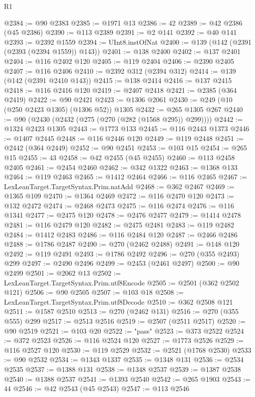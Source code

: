 \begin{lexlean}{R1}
\begin{coremodule}
@2384 := @90 @2383
@2385 := @1971 @13
@2386 := 42
@2389 := @42 @2386 (@45 @2386)
@2390 := @113 @2389
@2391 := @2 @141
@2392 := @40 @141
@2393 := @2392 @1559
@2394 := UInt8.instOfNat
@2400 := @139 (@142 (@2391 (@2393 (@2394 @1559)) @143))
@2401 := @138 @2400
@2402 := @137 @2401
@2404 := @116 @2402 @120
@2405 := @119 @2404
@2406 := @2390 @2405
@2407 := @116 @2406
@2410 := @2392 @312 (@2394 @312)
@2414 := @139 (@142 (@2391 @2410 @143))
@2415 := @138 @2414
@2416 := @137 @2415
@2418 := @116 @2416 @120
@2419 := @2407 @2418
@2421 := @2385 (@364 @2419)
@2422 := @90 @2421
@2423 := @1306 @2061
@2430 := @249 (@10 (@250 @2423 @1305) (@1306 @52)) @1305
@2432 := @265 @1305 @267
@2440 := @90 (@2430 (@2432 (@275 (@270 (@282 (@1568 @295)) @299))))
@2442 := @1324 @2423 @1305
@2443 := @1773 @133
@2445 := @116 @2443 @1373
@2446 := @1407 @2445
@2448 := @116 @2446 @120
@2449 := @119 @2448
@2451 := @2442 (@364 @2449)
@2452 := @90 @2451
@2453 := @103 @15
@2454 := @265 @15
@2455 := 43
@2458 := @42 @2455 (@45 @2455)
@2460 := @113 @2458 @2405
@2461 := @2454 @2460
@2462 := @342 @1322
@2463 := @1368 @133
@2464 := @119 @2463
@2465 := @1412 @2464
@2466 := @116 @2465
@2467 := LexLeanTarget.TargetSyntax.Prim.natAdd
@2468 := @362 @2467
@2469 := @1365 @109
@2470 := @1364 @2469
@2472 := @116 @2470 @120
@2473 := @132 @2472
@2474 := @2468 @2473
@2475 := @116 @2474
@2476 := @116 @1341
@2477 := @2475 @120
@2478 := @2476 @2477
@2479 := @1414 @2478
@2481 := @116 @2479 @120
@2482 := @2475 @2481
@2483 := @119 @2482
@2484 := @1412 @2483
@2486 := @116 @2484 @120
@2487 := @2466 @2486
@2488 := @1786 @2487
@2490 := @270 (@2462 @2488)
@2491 := @148 @120
@2492 := @119 @2491
@2493 := @1786 @2492
@2496 := @270 (@355 @2493) @299
@2497 := @2490 @2496
@2499 := @2453 (@2461 @2497)
@2500 := @90 @2499
@2501 := @2062 @13
@2502 := LexLeanTarget.TargetSyntax.Prim.utf8Encode
@2505 := @2501 (@362 @2502 @121)
@2506 := @90 @2505
@2507 := @103 @18
@2508 := LexLeanTarget.TargetSyntax.Prim.utf8Decode
@2510 := @362 @2508 @121
@2511 := @1587 @2510
@2513 := @270 (@2462 @131)
@2516 := @270 (@355 @555) @299
@2517 := @2513 @2516
@2519 := @2507 (@2511 @2517)
@2520 := @90 @2519
@2521 := @103 @20
@2522 := "pass"
@2523 := @373 @2522
@2524 := @372 @2523
@2526 := @116 @2524 @120
@2527 := @1773 @2526
@2529 := @116 @2527 @120
@2530 := @119 @2529
@2532 := @2521 (@1768 @2530)
@2533 := @90 @2532
@2534 := @1343 @1337
@2535 := @1348 @131
@2536 := @2534 @2535
@2537 := @1388 @131
@2538 := @1348 @2537
@2539 := @1387 @2538
@2540 := @1388 @2537
@2541 := @1393 @2540
@2542 := @265 @1903
@2543 := 44
@2546 := @42 @2543 (@45 @2543)
@2547 := @113 @2546

\end{coremodule}
\end{lexlean}
